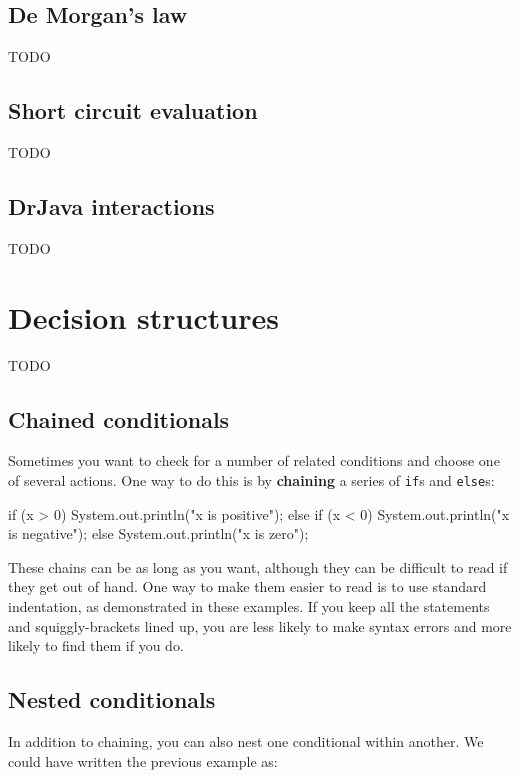 \documentclass[12pt]{book}
\begin{document}
\subsection{De Morgan's law}
TODO

\subsection{Short circuit evaluation}
TODO

\subsection{DrJava interactions}
TODO


\section{Decision structures}
TODO

\subsection{Chained conditionals}


Sometimes you want to check for a number of related conditions and choose one of several actions.
One way to do this is by {\bf chaining} a series of {\tt if}s and {\tt else}s:

\begin{code}
    if (x > 0) {
        System.out.println("x is positive");
    } else if (x < 0) {
        System.out.println("x is negative");
    } else {
        System.out.println("x is zero");
    }
\end{code}

These chains can be as long as you want, although they can be difficult to read if they get out of hand.
One way to make them easier to read is to use standard indentation, as demonstrated in these examples.
If you keep all the statements and squiggly-brackets lined up, you are less likely to make syntax errors and more likely to find them if you do.

\subsection{Nested conditionals}


In addition to chaining, you can also nest one conditional within another.
We could have written the previous example as:
\end{document}

